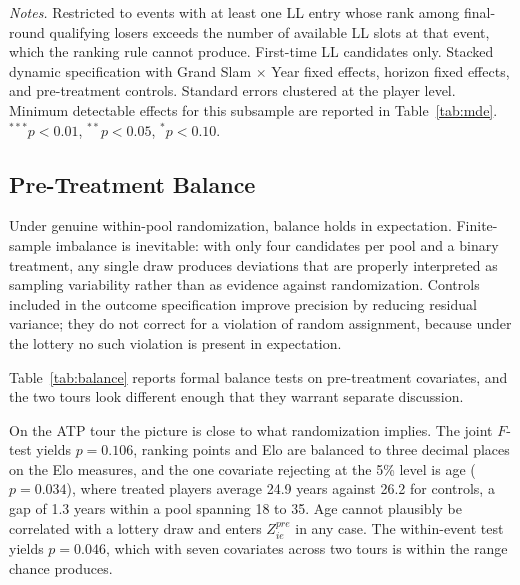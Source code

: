 \begin{table}[htbp]
\centering
\caption{First-LL Verified Lottery Subsample: Dynamic Effects}
\label{tab:verified_firstll}
\begin{threeparttable}
\small

\begin{tablenotes}
\footnotesize
\item \textit{Notes.} Restricted to events with at least one LL entry whose rank among final-round qualifying losers exceeds the number of available LL slots at that event, which the ranking rule cannot produce. First-time LL candidates only. Stacked dynamic specification with Grand Slam $\times$ Year fixed effects, horizon fixed effects, and pre-treatment controls. Standard errors clustered at the player level. Minimum detectable effects for this subsample are reported in Table~\ref{tab:mde}. $^{***}p<0.01$, $^{**}p<0.05$, $^{*}p<0.10$.
\end{tablenotes}
\end{threeparttable}
\end{table}

\subsection{Pre-Treatment Balance}
\label{sec:robustness_balance}

Under genuine within-pool randomization, balance holds in expectation. Finite-sample imbalance is inevitable: with only four candidates per pool and a binary treatment, any single draw produces deviations that are properly interpreted as sampling variability rather than as evidence against randomization. Controls included in the outcome specification improve precision by reducing residual variance; they do not correct for a violation of random assignment, because under the lottery no such violation is present in expectation.

Table~\ref{tab:balance} reports formal balance tests on pre-treatment covariates, and the two tours look different enough that they warrant separate discussion.

On the ATP tour the picture is close to what randomization implies. The joint $F$-test yields $p = 0.106$, ranking points and Elo are balanced to three decimal places on the Elo measures, and the one covariate rejecting at the 5\% level is age ($p = 0.034$), where treated players average 24.9 years against 26.2 for controls, a gap of 1.3 years within a pool spanning 18 to 35. Age cannot plausibly be correlated with a lottery draw and enters $Z^{pre}_{ie}$ in any case. The within-event test yields $p = 0.046$, which with seven covariates across two tours is within the range chance produces.

